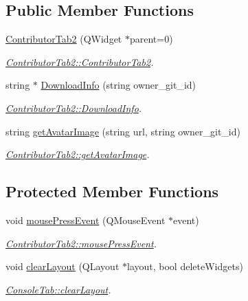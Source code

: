 \subsection*{Public Member Functions}
\begin{DoxyCompactItemize}
\item 
\hyperlink{classContributorTab2_afb63f19687c265fe4fc325040cc2d8d7}{Contributor\+Tab2} (Q\+Widget $\ast$parent=0)
\begin{DoxyCompactList}\small\item\em \hyperlink{classContributorTab2_afb63f19687c265fe4fc325040cc2d8d7}{Contributor\+Tab2\+::\+Contributor\+Tab2}. \end{DoxyCompactList}\item 
string $\ast$ \hyperlink{classContributorTab2_a5b9c63b5497b9e095624cd01969f0101}{Download\+Info} (string owner\+\_\+git\+\_\+id)
\begin{DoxyCompactList}\small\item\em \hyperlink{classContributorTab2_a5b9c63b5497b9e095624cd01969f0101}{Contributor\+Tab2\+::\+Download\+Info}. \end{DoxyCompactList}\item 
string \hyperlink{classContributorTab2_aed6aceb6bd6c0fb3d32e435a731133d8}{get\+Avatar\+Image} (string url, string owner\+\_\+git\+\_\+id)
\begin{DoxyCompactList}\small\item\em \hyperlink{classContributorTab2_aed6aceb6bd6c0fb3d32e435a731133d8}{Contributor\+Tab2\+::get\+Avatar\+Image}. \end{DoxyCompactList}\end{DoxyCompactItemize}
\subsection*{Protected Member Functions}
\begin{DoxyCompactItemize}
\item 
void \hyperlink{classContributorTab2_a93c3ed51e9f40c439ed4182e4407434a}{mouse\+Press\+Event} (Q\+Mouse\+Event $\ast$event)
\begin{DoxyCompactList}\small\item\em \hyperlink{classContributorTab2_a93c3ed51e9f40c439ed4182e4407434a}{Contributor\+Tab2\+::mouse\+Press\+Event}. \end{DoxyCompactList}\item 
void \hyperlink{classContributorTab2_a7bc323cf603d03913d96ade9536d8f7e}{clear\+Layout} (Q\+Layout $\ast$layout, bool delete\+Widgets)
\begin{DoxyCompactList}\small\item\em \hyperlink{classConsoleTab_aae70e23b23e401b219edefcac4882eaf}{Console\+Tab\+::clear\+Layout}. \end{DoxyCompactList}\end{DoxyCompactItemize}
